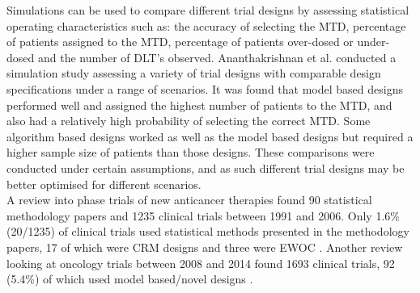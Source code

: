 \documentclass[a4paper, 11pt]{article} %
\newcommand{\RN}[1]{
	\textup{\uppercase\expandafter{\romannumeral#1}}} %
\begin{document}
\noindent Simulations can be used to compare different trial designs by assessing statistical operating characteristics such as: the accuracy of selecting the MTD, percentage of patients assigned to the MTD, percentage of patients over-dosed or under-dosed and the number of DLT's observed. Ananthakrishnan et al. \cite{Ananthakrishnan2017} conducted a simulation study assessing a variety of trial designs with comparable design specifications under a range of scenarios. It was found that model based designs performed well and assigned the highest number of patients to the MTD, and also had a relatively high probability of selecting the correct MTD. Some algorithm based designs worked as well as the model based designs but required a higher sample size of patients than those designs. These comparisons were conducted under certain assumptions, and as such different trial designs may be better optimised for different scenarios. \\

\noindent A review into phase\RN{1} trials of new anticancer therapies found 90 statistical methodology papers and 1235 clinical trials between 1991 and 2006. Only 1.6\% (20/1235) of clinical trials used statistical methods presented in the methodology papers, 17 of which were CRM designs and three were EWOC \cite{Rogatko2007}. Another review looking at oncology trials between 2008 and 2014 found 1693 clinical trials, 92 (5.4\%) of which used model based/novel designs \cite{Chiuzan2017}.  \\
\end{document}
